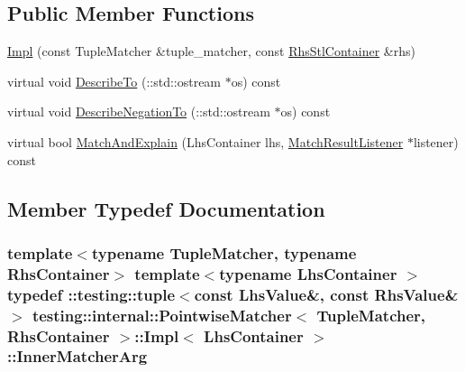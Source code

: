 \subsection*{Public Member Functions}
\begin{DoxyCompactItemize}
\item 
\hyperlink{classtesting_1_1internal_1_1_pointwise_matcher_1_1_impl_aaf6841b254ef78395919dfc5705dd152}{Impl} (const Tuple\+Matcher \&tuple\+\_\+matcher, const \hyperlink{classtesting_1_1internal_1_1_pointwise_matcher_aadbaec8c93351f29b103816c2e397edd}{Rhs\+Stl\+Container} \&rhs)
\item 
virtual void \hyperlink{classtesting_1_1internal_1_1_pointwise_matcher_1_1_impl_a34f78176359346ba3fd46c7e4c7b08cf}{Describe\+To} (\+::std\+::ostream $\ast$os) const 
\item 
virtual void \hyperlink{classtesting_1_1internal_1_1_pointwise_matcher_1_1_impl_a2098bacac67c13d29709d357033e2d3a}{Describe\+Negation\+To} (\+::std\+::ostream $\ast$os) const 
\item 
virtual bool \hyperlink{classtesting_1_1internal_1_1_pointwise_matcher_1_1_impl_ad3cad1e0b3e5d3a204c5b0f5a95d178b}{Match\+And\+Explain} (Lhs\+Container lhs, \hyperlink{classtesting_1_1_match_result_listener}{Match\+Result\+Listener} $\ast$listener) const 
\end{DoxyCompactItemize}


\subsection{Member Typedef Documentation}
\subsubsection[{\texorpdfstring{Inner\+Matcher\+Arg}{InnerMatcherArg}}]{\setlength{\rightskip}{0pt plus 5cm}template$<$typename Tuple\+Matcher, typename Rhs\+Container$>$ template$<$typename Lhs\+Container $>$ typedef \+::testing\+::tuple$<$const {\bf Lhs\+Value}\&, const {\bf Rhs\+Value}\&$>$ {\bf testing\+::internal\+::\+Pointwise\+Matcher}$<$ Tuple\+Matcher, Rhs\+Container $>$\+::{\bf Impl}$<$ Lhs\+Container $>$\+::{\bf Inner\+Matcher\+Arg}}\hypertarget{classtesting_1_1internal_1_1_pointwise_matcher_1_1_impl_aba9d983881cbfbb37724b8b40e863898}{}\label{classtesting_1_1internal_1_1_pointwise_matcher_1_1_impl_aba9d983881cbfbb37724b8b40e863898}
